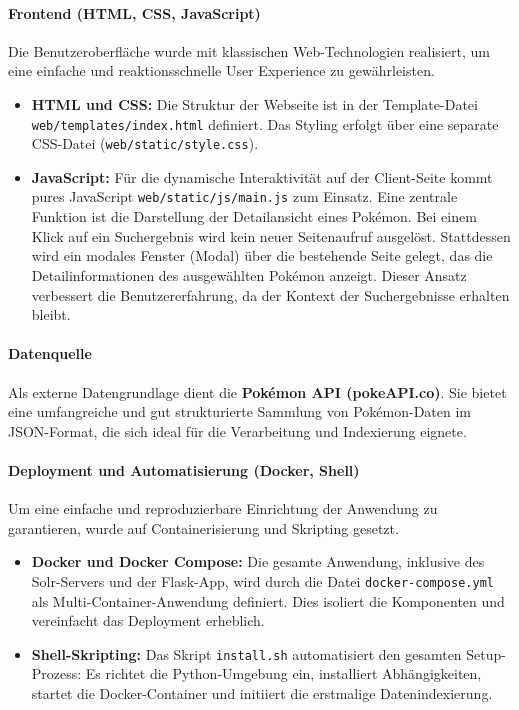 \paragraph{Frontend (HTML, CSS, JavaScript)}
Die Benutzeroberfläche wurde mit klassischen Web-Technologien realisiert, um eine einfache und reaktionsschnelle User Experience zu gewährleisten.
\begin{itemize}
    \item \textbf{HTML und CSS:} Die Struktur der Webseite ist in der Template-Datei \texttt{web/templates/index.html} definiert. Das Styling erfolgt über eine separate CSS-Datei (\texttt{web/static/style.css}).
    
    \item \textbf{JavaScript:} Für die dynamische Interaktivität auf der Client-Seite kommt pures JavaScript \texttt{web/\allowbreak static/\allowbreak js/\allowbreak main.js} zum Einsatz. Eine zentrale Funktion ist die Darstellung der Detailansicht eines Pokémon. Bei einem Klick auf ein Suchergebnis wird kein neuer Seitenaufruf ausgelöst. Stattdessen wird ein modales Fenster (Modal) über die bestehende Seite gelegt, das die Detailinformationen des ausgewählten Pokémon anzeigt. Dieser Ansatz verbessert die Benutzererfahrung, da der Kontext der Suchergebnisse erhalten bleibt.
\end{itemize}

\paragraph{Datenquelle}
Als externe Datengrundlage dient die \textbf{Pokémon API (pokeAPI.co)}. Sie bietet eine umfangreiche und gut strukturierte Sammlung von Pokémon-Daten im JSON-Format, die sich ideal für die Verarbeitung und Indexierung eignete.

\paragraph{Deployment und Automatisierung (Docker, Shell)}
Um eine einfache und reproduzierbare Einrichtung der Anwendung zu garantieren, wurde auf Containerisierung und Skripting gesetzt.
\begin{itemize}
    \item \textbf{Docker und Docker Compose:} Die gesamte Anwendung, inklusive des Solr-Servers und der Flask-App, wird durch die Datei \texttt{docker-compose.yml} als Multi-Container-Anwendung definiert. Dies isoliert die Komponenten und vereinfacht das Deployment erheblich.
    
    \item \textbf{Shell-Skripting:} Das Skript \texttt{install.sh} automatisiert den gesamten Setup-Prozess: Es richtet die Python-Umgebung ein, installiert Abhängigkeiten, startet die Docker-Container und initiiert die erstmalige Datenindexierung.
\end{itemize}